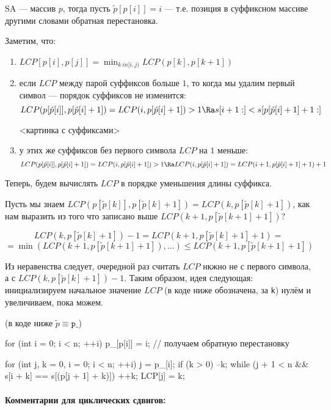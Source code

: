 SA --- массив $p$, тогда пусть $\tilde{p}[p[i]] = i$ --- т.е. позиция в суффиксном массиве другими словами обратная перестановка.

Заметим, что:
\begin{enumerate}
	\item $LCP[p[i], p[j]] = \min_{k \ in [i, j)} LCP(p[k], p[k + 1])$
	\item если $LCP$ между парой суффиксов больше $1$, то когда мы удалим первый символ --- порядок суффиксов не изменится:
			\[LCP(p[\tilde{p}[i]], p[\tilde{p}[i] + 1]) = LCP(i, p[\tilde{p}[i] + 1]) > 1 \Ra s[i + 1:] < s[p[\tilde{p}[i] + 1] + 1:]\]

	<картинка с суффиксами>
	
	\item у этих же суффиксов без первого символа $LCP$ на $1$ меньше:
		\[ LCP(p[\tilde{p}[i]], p[\tilde{p}[i] + 1]) = LCP(i, p[\tilde{p}[i] + 1]) > 1 \Ra LCP(i, p[\tilde{p}[i] + 1]) = LCP(i + 1, p[\tilde{p}[i] + 1] + 1) + 1 \]
\end{enumerate} 

Теперь, будем вычислять $LCP$ в порядке уменьшения длины суффикса. 

Пусть мы знаем $LCP(p[\tilde{p}[k]], p[\tilde{p}[k] + 1]) = LCP(k, p[\tilde{p}[k] + 1])$, как нам выразить из 
того что записано выше $LCP(k + 1, p[\tilde{p}[k + 1] + 1])$?

\[ LCP(k, p[\tilde{p}[k] + 1]) - 1 = LCP(k + 1, p[\tilde{p}[k] + 1] + 1) =  \]
\[= \min (LCP(k + 1, p[\tilde{p}[k + 1] + 1]),...) \leq LCP(k + 1, p[\tilde{p}[k + 1] + 1]) \]

Из неравенства следует, очередной раз считать $LCP$ нкжно не с первого символа, а с $LCP(k, p[\tilde{p}[k] + 1]) - 1$.
Таким образом, идея следующая: инициализируем начальное значение $LCP$ (в коде ниже обозначена, за \texttt{k}) нулём и увеличиваем, пока можем.

(в коде ниже $\tilde{p} \equiv \texttt{p\_}$)
\begin{cppcode}
for (int i = 0; i < n; ++i) 
		p_[p[i]] = i;		// получаем обратную перестановку

for (int j, k = 0, i = 0; i < n; ++i) {
		j = p_[i];
		if (k > 0) --k;
		while (j + 1 < n && s[i + k] == s[(p[j + 1] + k)])
			++k;
		LCP[j] = k;
	}
\end{cppcode}

\paragraph*{Комментарии для циклических сдвигов:}

